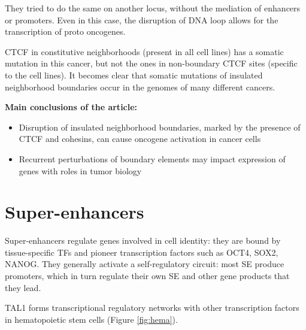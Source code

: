 They tried to do the same on another locus, without the mediation of enhancers or promoters. Even in this case,  the disruption of DNA loop allows for the transcription of proto oncogenes.

CTCF in constitutive neighborhoods (present in all cell lines) has a somatic mutation in this cancer, but not the ones in non-boundary CTCF sites (specific to the cell lines). It becomes clear that somatic mutations of insulated neighborhood boundaries occur in the genomes of many different cancers.

\textbf{Main conclusions of the article:}
\begin{itemize}
\item Disruption of insulated neighborhood boundaries, marked by the presence of CTCF and cohesins,
can cause oncogene activation in cancer cells
\item Recurrent perturbations of boundary elements may impact expression of genes with roles in
tumor biology
\end{itemize}

\hypertarget{super-enhancers}{%
\section{Super-enhancers}\label{super-enhancers}}

Super-enhancers regulate genes involved in cell identity: they are bound by tissue-specific TFs and pioneer transcription factors such as OCT4, SOX2, NANOG. They generally activate a self-regulatory circuit: most SE produce promoters, which in turn regulate their own SE and other gene products that they lead.

TAL1 forms transcriptional regulatory networks with other transcription factors in hematopoietic stem cells (Figure \ref{fig:hema}).

